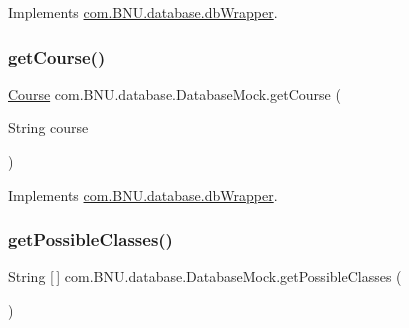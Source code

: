 Implements \mbox{\hyperlink{interfacecom_1_1_b_n_u_1_1database_1_1db_wrapper_a86e057ce56cf8e7c75ee79bfc8bfcd21}{com.\+B\+N\+U.\+database.\+db\+Wrapper}}.

\mbox{\label{classcom_1_1_b_n_u_1_1database_1_1_database_mock_a0c35cbc9bbb46241d65bbffa50d49b83}} 
\subsubsection{\texorpdfstring{get\+Course()}{getCourse()}}
{\footnotesize\ttfamily \mbox{\hyperlink{classcom_1_1_b_n_u_1_1pages_1_1classes_by_teacher_1_1_course}{Course}} com.\+B\+N\+U.\+database.\+Database\+Mock.\+get\+Course (\begin{DoxyParamCaption}\item[{String}]{course }\end{DoxyParamCaption})}



Implements \mbox{\hyperlink{interfacecom_1_1_b_n_u_1_1database_1_1db_wrapper_a1dda3f09c5d0381e824cf71276e67447}{com.\+B\+N\+U.\+database.\+db\+Wrapper}}.

\mbox{\label{classcom_1_1_b_n_u_1_1database_1_1_database_mock_a6c43f4a70a1c4c2060b58855ae45257a}} 
\subsubsection{\texorpdfstring{get\+Possible\+Classes()}{getPossibleClasses()}}
{\footnotesize\ttfamily String \mbox{[}$\,$\mbox{]} com.\+B\+N\+U.\+database.\+Database\+Mock.\+get\+Possible\+Classes (\begin{DoxyParamCaption}{ }\end{DoxyParamCaption})}



